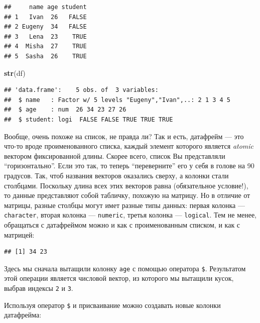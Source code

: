 \documentclass[]{book}
\newenvironment{Shaded}{\begin{snugshade}}{\end{snugshade}}
\newcommand{\KeywordTok}[1]{\textcolor[rgb]{0.13,0.29,0.53}{\textbf{#1}}}
\newcommand{\DecValTok}[1]{\textcolor[rgb]{0.00,0.00,0.81}{#1}}
\newcommand{\OperatorTok}[1]{\textcolor[rgb]{0.81,0.36,0.00}{\textbf{#1}}}
\newcommand{\NormalTok}[1]{#1}
\begin{document}
\begin{verbatim}
##     name age student
## 1   Ivan  26   FALSE
## 2 Eugeny  34   FALSE
## 3   Lena  23    TRUE
## 4  Misha  27    TRUE
## 5  Sasha  26    TRUE
\end{verbatim}

\begin{Shaded}
\begin{Highlighting}[]
\KeywordTok{str}\NormalTok{(df)}
\end{Highlighting}
\end{Shaded}

\begin{verbatim}
## 'data.frame':    5 obs. of  3 variables:
##  $ name   : Factor w/ 5 levels "Eugeny","Ivan",..: 2 1 3 4 5
##  $ age    : num  26 34 23 27 26
##  $ student: logi  FALSE FALSE TRUE TRUE TRUE
\end{verbatim}

Вообще, очень похоже на список, не правда ли? Так и есть, датафрейм ---
это что-то вроде проименованного списка, каждый элемент которого
является \emph{atomic} вектором фиксированной длины. Скорее всего,
список Вы представляли ``горизонтально''. Если это так, то теперь
``переверните'' его у себя в голове на 90 градусов. Так, чтоб названия
векторов оказались сверху, а колонки стали столбцами. Поскольку длина
всех этих векторов равна (обязательное условие!), то данные представляют
собой табличку, похожую на матрицу. Но в отличие от матрицы, разные
столбцы могут имет разные типы данных: первая колонка ---
\texttt{character}, вторая колонка --- \texttt{numeric}, третья колонка
--- \texttt{logical}. Тем не менее, обращаться с датафреймом можно и как
с проименованным списком, и как с матрицей:

\begin{Shaded}
\end{Shaded}

\begin{verbatim}
## [1] 34 23
\end{verbatim}

Здесь мы сначала вытащили колонку \texttt{age} с помощью оператора
\texttt{\$}. Результатом этой операции является числовой вектор, из
которого мы вытащили кусок, выбрав индексы \texttt{2} и \texttt{3}.

Используя оператор \texttt{\$} и присваивание можно создавать новые
колонки датафрейма:
\end{document}
